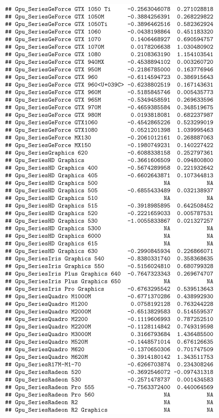 \documentclass[12pt]{article}
\begin{document}
\begin{figure}[h!]
    \centering
    \includegraphics{Model_1_CI(4_5).png}
    \label{fig:CI14}
\end{figure}
\end{document}
